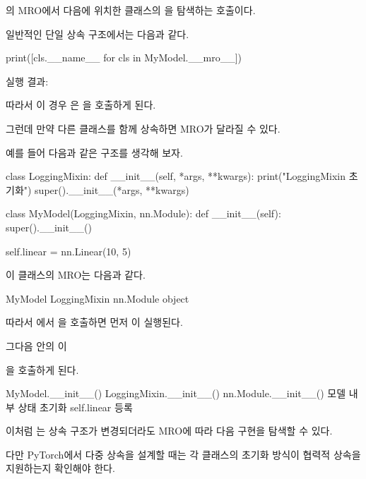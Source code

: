 의 MRO에서  다음에 위치한 클래스의 을 탐색하는 호출이다.

일반적인 단일 상속 구조에서는 다음과 같다.

\begin{dhkcode}
print([cls.__name__ for cls in MyModel.__mro__])
\end{dhkcode}

실행 결과:

\begin{dhkzsh}
\end{dhkzsh}

따라서 이 경우 은 을 호출하게 된다.

그런데 만약 다른 클래스를 함께 상속하면 MRO가 달라질 수 있다.

예를 들어 다음과 같은 구조를 생각해 보자.

\begin{dhkcode}
class LoggingMixin:
    def __init__(self, *args, **kwargs):
        print("LoggingMixin 초기화")
        super().__init__(*args, **kwargs)


class MyModel(LoggingMixin, nn.Module):
    def __init__(self):
        super().__init__()

        self.linear = nn.Linear(10, 5)
\end{dhkcode}

이 클래스의 MRO는 다음과 같다.

\begin{dhksmry}[centered]
MyModel \ra LoggingMixin \ra nn.Module \ra object
\end{dhksmry}

따라서 에서 을 호출하면 먼저 이 실행된다.

그다음  안의 이 

을 호출하게 된다.

\begin{dhksmry}[centered]
MyModel.__init__()
\da
LoggingMixin.__init__()
\da
nn.Module.__init__()
\da
모델 내부 상태 초기화
\da
self.linear 등록
\end{dhksmry}

이처럼 는 상속 구조가 변경되더라도 MRO에 따라 다음 구현을 탐색할 수 있다.

다만 PyTorch에서 다중 상속을 설계할 때는 각 클래스의 초기화 방식이 협력적 상속을 지원하는지 확인해야 한다.

